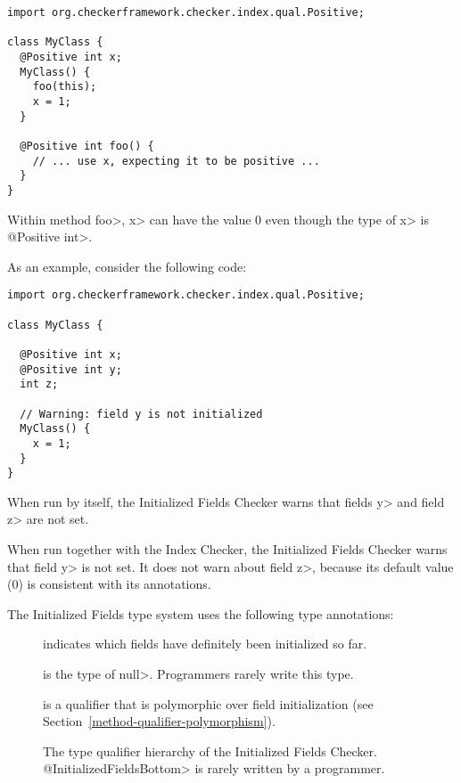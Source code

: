 \begin{Verbatim}
import org.checkerframework.checker.index.qual.Positive;

class MyClass {
  @Positive int x;
  MyClass() {
    foo(this);
    x = 1;
  }

  @Positive int foo() {
    // ... use x, expecting it to be positive ...
  }
}
\end{Verbatim}

\noindent
Within method \<foo>, \<x> can have the value 0 even though the type of
\<x> is \<@Positive int>.



As an example, consider the following code:

\begin{Verbatim}
import org.checkerframework.checker.index.qual.Positive;

class MyClass {

  @Positive int x;
  @Positive int y;
  int z;

  // Warning: field y is not initialized
  MyClass() {
    x = 1;
  }
}
\end{Verbatim}

When run by itself, the Initialized Fields Checker warns that fields \<y>
and field \<z> are not set.

When run together with the Index Checker, the Initialized Fields Checker
warns that field \<y> is not set.  It does not warn about field \<z>,
because its default value (0) is consistent with its annotations.



The Initialized Fields type system uses the following type annotations:
\begin{description}
\item[]
  indicates which fields have definitely been initialized so far.
\item[]
  is the type of \<null>.  Programmers rarely write this type.
\item[]
  is a qualifier that is polymorphic over field initialization (see
  Section~\ref{method-qualifier-polymorphism}).
\end{description}

\begin{figure}
\caption{The type qualifier hierarchy of the Initialized Fields Checker.
\<@InitializedFieldsBottom> is rarely written by a programmer.}
\label{fig-initialized-fields-hierarchy}
\end{figure}

